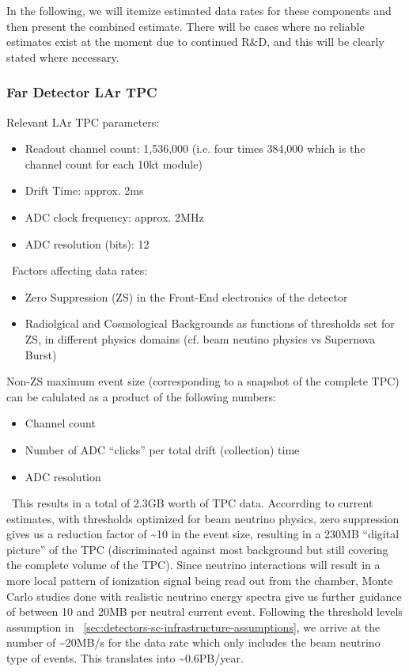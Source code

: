 In the following, we will itemize estimated data rates for these components and then present the combined estimate.
There will be cases where no reliable estimates exist at the moment due to continued R\&D, and this will be clearly stated where necessary.

\subsubsection{Far Detector LAr TPC}
Relevant  LAr TPC parameters:
\begin{itemize}
\item Readout channel count: 1,536,000 (i.e. four times 384,000 which is the channel count for each 10kt module)
\item Drift Time: approx. 2ms
\item ADC clock frequency: approx. 2MHz
\item ADC resolution (bits): 12
\end{itemize}
\
Factors affecting data rates:
\begin{itemize}
\item Zero Suppression (ZS)  in the Front-End electronics of the detector
\item Radiolgical and Cosmological Backgrounds as functions of thresholds set for ZS, in different physics domains (cf. beam neutino physics vs Supernova Burst)
\end{itemize}

Non-ZS maximum event size (corresponding to a snapshot of the complete TPC) can be calulated as a product of the following numbers:
\begin{itemize}
\item Channel count
\item Number of ADC ``clicks'' per total drift (collection) time
\item ADC resolution
\end{itemize}
\
This results in a total of 2.3GB worth of TPC data. Accorrding to current estimates, with thresholds optimized for beam neutrino physics, zero suppression
gives us a reduction factor of \textasciitilde 10 in the event size, resulting in a 230MB ``digital picture'' of the TPC (discriminated against most background
but still covering the complete volume of the TPC). Since neutrino interactions will result in a more local pattern of ionization signal being read out
from the chamber, Monte Carlo studies done with realistic neutrino energy spectra give us further guidance of between 10 and 20MB per neutral current event.
Following the threshold levels assumption in ~\ref{sec:detectors-sc-infrastructure-assumptions}, we arrive at the number of \textasciitilde 20MB/s for the data rate
which only includes the beam neutrino type of events. This translates into \textasciitilde 0.6PB/year.


